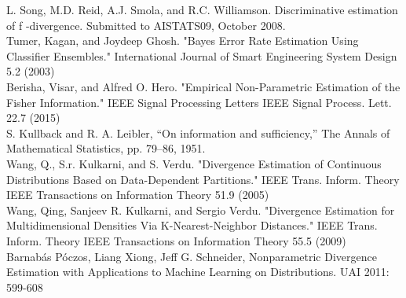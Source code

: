 \documentclass{article}
\begin{document}
	\noindent [23] L. Song, M.D. Reid, A.J. Smola, and R.C. Williamson. Discriminative estimation of f -divergence. Submitted to AISTATS09, October 2008.
	\\ [0.5ex]
	
	\noindent [24] Tumer, Kagan, and Joydeep Ghosh. "Bayes Error Rate Estimation Using Classifier Ensembles." International Journal of Smart Engineering System Design 5.2 (2003)
	\\ [0.5ex]
	
	\noindent [25] Berisha, Visar, and Alfred O. Hero. "Empirical Non-Parametric Estimation of the Fisher Information." IEEE Signal Processing Letters IEEE Signal Process. Lett. 22.7 (2015)
	\\ [0.5ex]
	
	\noindent [26] S. Kullback and R. A. Leibler, “On information and sufficiency,” The	Annals of Mathematical Statistics, pp. 79–86, 1951.
	\\ [0.5ex]
	
	\noindent [27] Wang, Q., S.r. Kulkarni, and S. Verdu. "Divergence Estimation of Continuous Distributions Based on Data-Dependent Partitions." IEEE Trans. Inform. Theory IEEE Transactions on Information Theory 51.9 (2005)
	\\ [0.5ex]
	
	\noindent [28] Wang, Qing, Sanjeev R. Kulkarni, and Sergio Verdu. "Divergence Estimation for Multidimensional Densities Via K-Nearest-Neighbor Distances." IEEE Trans. Inform. Theory IEEE Transactions on Information Theory 55.5 (2009)
	\\ [0.5ex]

	\noindent [29]Barnabás Póczos, Liang Xiong, Jeff G. Schneider, Nonparametric Divergence Estimation with Applications to Machine Learning on Distributions. UAI 2011: 599-608
	
	
\end{document}
